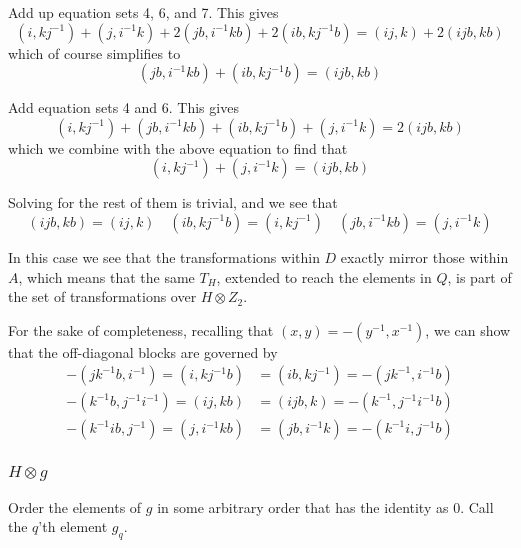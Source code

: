 \documentclass{revtex4-1}
\begin{document}
\par Add up equation sets 4, 6, and 7.  This gives
\begin{equation}
(i,kj^{-1}) + (j,i^{-1}k) + 2 (jb,i^{-1}kb) + 2 (ib,kj^{-1}b) = (ij,k) + 2 (ijb,kb)
\end{equation}
which of course simplifies to
\begin{equation}
(jb,i^{-1}kb) + (ib,kj^{-1}b) = (ijb,kb)
\end{equation}

\par Add equation sets 4 and 6.  This gives
\begin{equation}
(i,kj^{-1}) + (jb,i^{-1}kb) + (ib,kj^{-1}b) + (j,i^{-1}k) = 2 (ijb,kb)
\end{equation}
which we combine with the above equation to find that
\begin{equation}
(i,kj^{-1}) + (j,i^{-1}k) = (ijb,kb)
\end{equation}

\par Solving for the rest of them is trivial, and we see that
\begin{equation}
(ijb,kb) = (ij,k) \quad (ib,kj^{-1}b) = (i,kj^{-1}) \quad (jb,i^{-1}kb) = (j,i^{-1}k)
\end{equation}

In this case we see that the transformations within $D$ exactly mirror those within $A$, which
means that the same $T_H$, extended to reach the elements in $Q$, is part of the set of transformations
over $H \otimes Z_2$.

\par For the sake of completeness, recalling that $(x,y) = - (y^{-1},x^{-1})$, we can show that
the off-diagonal blocks are governed by
\begin{align}
-(jk^{-1}b,i^{-1}) = (i,kj^{-1}b) &= (ib, kj^{-1}) = - (jk^{-1},i^{-1}b) \\
-(k^{-1}b,j^{-1}i^{-1}) = (ij, kb) &= (ijb, k) = - (k^{-1},j^{-1}i^{-1}b) \\
-(k^{-1}ib, j^{-1}) = (j,i^{-1}kb) &= (jb,i^{-1}k) = - (k^{-1}i, j^{-1}b)
\end{align}

\subsubsection{$H \otimes g$}

Order the elements of $g$ in some arbitrary order that has the identity as $0$.  Call the $q$'th element $g_q$.
\end{document}

